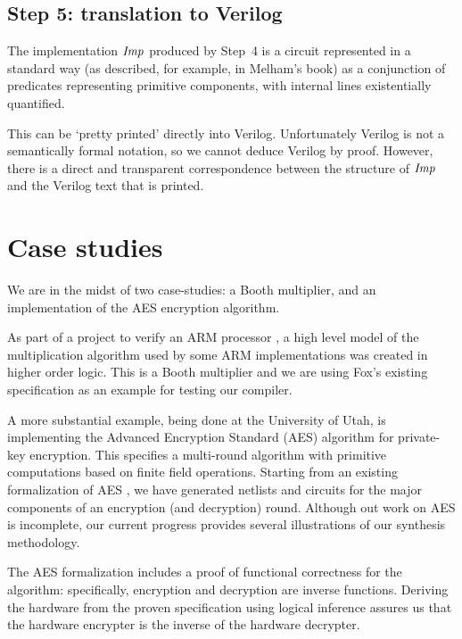 \documentclass{llncs}
\begin{document}
\subsection*{Step 5: translation to Verilog}

The implementation ${\it{Imp}}$ produced by Step~4 is a circuit
represented in a standard way (as described, for example, in Melham's book)
as a conjunction of predicates representing primitive components,
with internal lines existentially quantified.

This can be `pretty printed' directly into Verilog. Unfortunately
Verilog is not a semantically formal notation, so we cannot deduce
Verilog by proof. However, there is a direct and transparent
correspondence between the structure of ${\it{Imp}}$ and the Verilog
text that is printed.

\section{Case studies}
\label{secCaseStudy}


We are in the midst of two case-studies: a Booth multiplier, and an implementation
of the AES encryption algorithm.

As part of a project to verify an ARM processor \cite{Fox02}, a high
level model of the multiplication algorithm used by some ARM
implementations was created in higher order logic. This is a Booth
multiplier and we are using Fox's existing specification as an example
for testing our compiler. 


A more substantial example, being done at the University of Utah, is
implementing the Advanced Encryption Standard (AES) \cite{AES}
algorithm for private-key encryption. This specifies a multi-round
algorithm with primitive computations based on finite field
operations.  Starting from an existing formalization of AES
\cite{slind:aes}, we have generated netlists and circuits for the major
components of an encryption (and decryption) round.  Although out work on AES
is incomplete, our current progress provides several illustrations of our
synthesis methodology.

The AES formalization includes a proof of functional correctness  for the
algorithm: specifically, encryption and decryption are inverse functions.
Deriving the hardware from the proven specification using logical inference
assures us that the hardware encrypter is the inverse of the hardware
decrypter.
\end{document}
